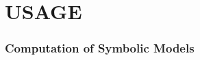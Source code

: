 \documentclass[a4paper]{amsart}
\newcommand{\intcc}[1]{\ensuremath{{\left[#1\right]}}}
\newcommand{\intco}[1]{\ensuremath{{\left[#1\right[}}}
\newcommand{\N}{\mathbb{N}}
\newcommand{\pre}{{\mathrm{pre}}}
\begin{document}
%
%


\newpage


\part{USAGE}

\section{Computation of Symbolic Models}
\label{s:usage:abs}
\end{document}
